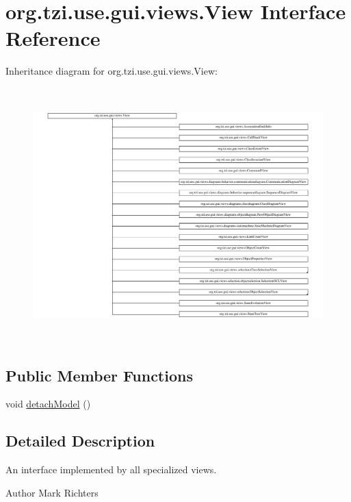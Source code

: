 \hypertarget{interfaceorg_1_1tzi_1_1use_1_1gui_1_1views_1_1_view}{\section{org.\-tzi.\-use.\-gui.\-views.\-View Interface Reference}
\label{interfaceorg_1_1tzi_1_1use_1_1gui_1_1views_1_1_view}
}
Inheritance diagram for org.\-tzi.\-use.\-gui.\-views.\-View\-:\begin{figure}[H]
\begin{center}
\leavevmode
\includegraphics[height=9.833641cm]{interfaceorg_1_1tzi_1_1use_1_1gui_1_1views_1_1_view}
\end{center}
\end{figure}
\subsection*{Public Member Functions}
\begin{DoxyCompactItemize}
\item 
void \hyperlink{interfaceorg_1_1tzi_1_1use_1_1gui_1_1views_1_1_view_a00aa5651d40e001288300a6b8bd36868}{detach\-Model} ()
\end{DoxyCompactItemize}


\subsection{Detailed Description}
An interface implemented by all specialized views.

\begin{DoxyAuthor}{Author}
Mark Richters 
\end{DoxyAuthor}


